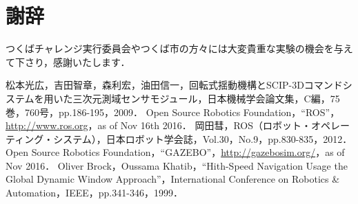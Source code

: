 \documentclass[10pt,a4paper]{jarticle}
\begin{document}
\section*{謝辞}
つくばチャレンジ実行委員会やつくば市の方々には大変貴重な実験の機会を与えて下さり，感謝いたします．
\begin{thebibliography}{9}
  松本光広，吉田智章，森利宏，油田信一，回転式揺動機構とSCIP-3Dコマンドシステムを用いた三次元測域センサモジュール，日本機械学会論文集，C編，75巻，760号，pp.186-195，2009．
  Open Source Robotics Foundation，``ROS''，\url{http://www.ros.org}，as of Nov 16th 2016．
  岡田彗，ROS（ロボット・オペレーティング・システム），日本ロボット学会誌，Vol.30，No.9，pp.830-835，2012．
  Open Source Robotics Foundation，``GAZEBO''，\url{http://gazebosim.org/}，as of Nov 2016．
  Oliver Brock，Oussama Khatib，``Hith-Speed Navigation Usage the Global Dynamic Window Approach''，International Conference on Robotics \& Automation，IEEE，pp.341-346，1999．
\end{thebibliography}
\end{document}
